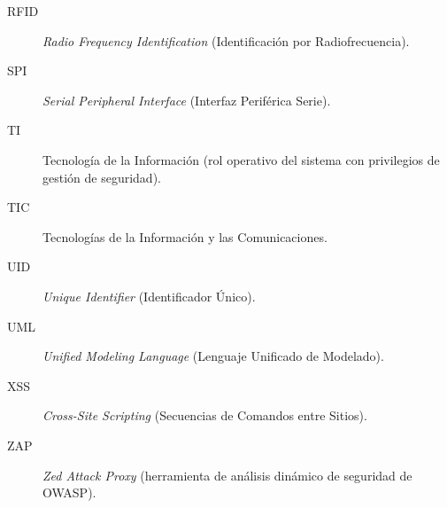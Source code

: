 \begin{description}
	\item[RFID] \textit{Radio Frequency Identification} (Identificación por Radiofrecuencia).
	\item[SPI] \textit{Serial Peripheral Interface} (Interfaz Periférica Serie).
	\item[TI] Tecnología de la Información (rol operativo del sistema con privilegios de gestión de seguridad).
	\item[TIC] Tecnologías de la Información y las Comunicaciones.
	\item[UID] \textit{Unique Identifier} (Identificador Único).
	\item[UML] \textit{Unified Modeling Language} (Lenguaje Unificado de Modelado).
	\item[XSS] \textit{Cross-Site Scripting} (Secuencias de Comandos entre Sitios).
	\item[ZAP] \textit{Zed Attack Proxy} (herramienta de análisis dinámico de seguridad de OWASP).
\end{description}
